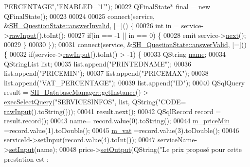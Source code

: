 \begin{DoxyCode}
{      PERCENTAGE"},\textcolor{stringliteral}{"ENABLED='1'"});
00022     QFinalState* \textcolor{keyword}{final} = \textcolor{keyword}{new} QFinalState();
00023 
00024 
00025     connect(service, &\hyperlink{classSH__QuestionState_a3348a8a683130678ac87a10ba2a25486}{SH\_QuestionState::answerInvalid}, [=]() \{
00026         \textcolor{keywordtype}{int} in = service->\hyperlink{classSH__DatabaseContentQuestionState_a344d9109e15509506b1b998d28392cac}{rawInput}().toInt();
00027         \textcolor{keywordflow}{if}(in == -1 || in == 0) \{
00028             emit service->\hyperlink{classSH__GenericState_a030e67a872956135c52e6876d960a7b5}{next}();
00029         \}
00030     \});
00031     connect(service, &\hyperlink{classSH__QuestionState_a04e259643788d15ab6244bc8a04286d6}{SH\_QuestionState::answerValid}, [=]() \{
00032         \textcolor{keywordflow}{if}(service->\hyperlink{classSH__DatabaseContentQuestionState_a344d9109e15509506b1b998d28392cac}{rawInput}().toInt() > -1) \{
00033             QString \hyperlink{classSH__NamedObject_a970f265df31b28b2179bbbceb6170ac2}{name};
00034             QStringList list;
00035             list.append(\textcolor{stringliteral}{"PRINTEDNAME"});
00036             list.append(\textcolor{stringliteral}{"PRICEMIN"});
00037             list.append(\textcolor{stringliteral}{"PRICEMAX"});
00038             list.append(\textcolor{stringliteral}{"VAT\_PERCENTAGE"});
00039             list.append(\textcolor{stringliteral}{"ID"});
00040             QSqlQuery result = \hyperlink{classSH__DatabaseManager_a638369a15265ab0aa053080a32d2ca39}{SH\_DatabaseManager::getInstance}()->
      \hyperlink{classSH__DatabaseManager_ab8f9850cb68444ab9a4e613b36a3b044}{execSelectQuery}(\textcolor{stringliteral}{"SERVICESINFOS"}, list, QString(\textcolor{stringliteral}{"CODE=%
      \hyperlink{classSH__DatabaseContentQuestionState_a344d9109e15509506b1b998d28392cac}{rawInput}().toString()));
00041             result.next();
00042             QSqlRecord record = result.record();
00043             name= record.value(0).toString();
00044             \hyperlink{classSH__ServiceCharging_a44584a7ff1edd6ae03c4f77544136c13}{m\_priceMin} =record.value(1).toDouble();
00045             \hyperlink{classSH__ServiceCharging_ae2fa75c56883dc4af6b0bbcbb86d0861}{m\_vat} =record.value(3).toDouble();
00046             serviceId->\hyperlink{classSH__InOutState_a0206ab7d5616f28b0da7bfd5451614e8}{setInput}(record.value(4).toInt());
00047             serviceName->\hyperlink{classSH__QuestionState_a331222d371d9c97392f35c84a5ef43e1}{setInput}(name);
00048             price->\hyperlink{classSH__InOutState_a7dc244d72e09fdbc30eb3a704b05a4d8}{setOutput}(QString(\textcolor{stringliteral}{"Le prix proposé pour cette prestation est : %
}}
\end{DoxyCode}
